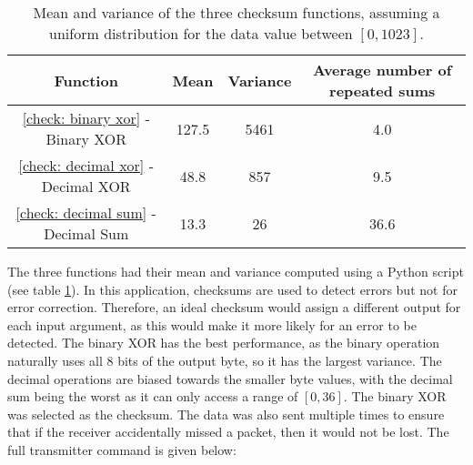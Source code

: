 \begin{table}[htb]
	\begin{center}
	\caption{Mean and variance of the three checksum functions, assuming a uniform distribution for the data value between $[0,1023]$.}
	\label{tab: checksums}
	\begin{tabular}{|c|c|c|c|}
		\hline
		\textbf{Function} & \textbf{Mean} & \textbf{Variance} & \textbf{Average number of repeated sums}\\
		\hline
		\ref{check: binary xor} - Binary XOR & 127.5 & 5461 & 4.0\\
		\ref{check: decimal xor} - Decimal XOR & 48.8 & 857 & 9.5\\
		\ref{check: decimal sum} - Decimal Sum & 13.3 & 26 & 36.6\\
		\hline
	\end{tabular}
	\end{center}
\end{table}

The three functions had their mean and variance computed using a Python script (see table \ref{tab: checksums}). In this application, checksums are used to detect errors but not for error correction. Therefore, an ideal checksum would assign a different output for each input argument, as this would make it more likely for an error to be detected. The binary XOR has the best performance, as the binary operation naturally uses all 8 bits of the output byte, so it has the largest variance. The decimal operations are biased towards the smaller byte values, with the decimal sum being the worst as it can only access a range of $[0,36]$. The binary XOR was selected as the checksum. The data was also sent multiple times to ensure that if the receiver accidentally missed a packet, then it would not be lost. The full transmitter command is given below:


